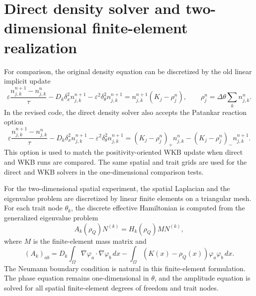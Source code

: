 \documentclass[11pt]{article}
\begin{document}
\section{Direct density solver and two-dimensional finite-element realization}\label{app:direct_2d}

For comparison, the original density equation can be discretized by the old linear implicit update
\begin{equation}\label{eq:direct_density_fully_new}
    \varepsilon\frac{n_{j,k}^{n+1}-n_{j,k}^n}{\tau}
    -D_k\delta_x^2n_{j,k}^{n+1}
    -\varepsilon^2\delta_\theta^2n_{j,k}^{n+1}
    =n_{j,k}^{n+1}(K_j-\rho_j^n),
    \qquad
    \rho_j^n=\Delta\theta\sum_k n_{j,k}^n.
\end{equation}
{\color{red} In the revised code, the direct density solver also accepts the Patankar reaction option
\begin{equation}\label{eq:direct_density_patankar_new}
    \varepsilon\frac{n_{j,k}^{n+1}-n_{j,k}^n}{\tau}
    -D_k\delta_x^2n_{j,k}^{n+1}
    -\varepsilon^2\delta_\theta^2n_{j,k}^{n+1}
    =(K_j-\rho_j^n)_+n_{j,k}^n-(K_j-\rho_j^n)_-n_{j,k}^{n+1}.
\end{equation}
This option is used to match the positivity-oriented WKB update when direct and WKB runs are compared.} The same spatial and trait grids are used for the direct and WKB solvers in the one-dimensional comparison tests.

For the two-dimensional spatial experiment, the spatial Laplacian and the eigenvalue problem are discretized by linear finite elements on a triangular mesh.  For each trait node \(\theta_k\), the discrete effective Hamiltonian is computed from the generalized eigenvalue problem
\begin{equation}\label{eq:fem_H_new}
    A_k(\rho_Q)N^{(k)}=H_k(\rho_Q)M N^{(k)},
\end{equation}
where \(M\) is the finite-element mass matrix and
\begin{equation}\label{eq:fem_A_new}
    (A_k)_{ab}
    =D_k\int_\Omega \nabla\varphi_a\cdot\nabla\varphi_b\,dx
    -\int_\Omega (K(x)-\rho_Q(x))\varphi_a\varphi_b\,dx.
\end{equation}
The Neumann boundary condition is natural in this finite-element formulation.  The phase equation remains one-dimensional in \(\theta\), and the amplitude equation is solved for all spatial finite-element degrees of freedom and trait nodes.
\end{document}
